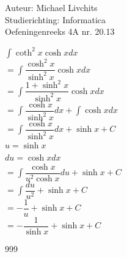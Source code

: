 \documentclass[a4paper]{article}
\begin{document}
  
\noindent \large Auteur: Michael Livchits \\
\noindent \large Studierichting: Informatica\\
\noindent \large Oefeningenreeks 4A nr. 20.13\\

\medskip

\normalsize

$\displaystyle\int\coth^2x \cosh x dx$\\

$ = \displaystyle\int\dfrac{\cosh^2x}{\sinh^2x} \cosh x dx$\\

$ = \displaystyle\int\dfrac{1+\sinh^2x}{\sinh^2x} \cosh x dx$\\

$ = \displaystyle\int\dfrac{\cosh x}{\sinh^2x}dx + \displaystyle\int\cosh x dx$\\

$ = \displaystyle\int\dfrac{\cosh x}{\sinh^2x}dx + \sinh x + C$\\

$u = \sinh x$\\

$du = \cosh xdx$\\

$ = \displaystyle\int\dfrac{\cosh x}{u^2\cosh x}du + \sinh x + C$\\

$ = \displaystyle\int\dfrac{du}{u^2} + \sinh x + C$\\

$ = -\dfrac{1}{u} + \sinh x + C$\\

$ = -\dfrac{1}{\sinh x} + \sinh x + C$\\

\begin{thebibliography}{999}
\end{thebibliography}
\end{document}
